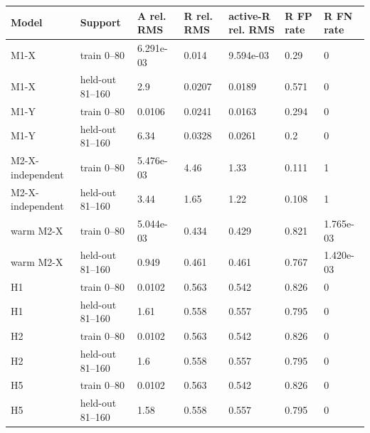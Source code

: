 \begin{tabular}{lllllll}
\toprule
Model & Support & A rel. RMS & R rel. RMS & active-R rel. RMS & R FP rate & R FN rate \\
\midrule
M1-X & train 0--80 & 6.291e-03 & 0.014 & 9.594e-03 & 0.29 & 0 \\
M1-X & held-out 81--160 & 2.9 & 0.0207 & 0.0189 & 0.571 & 0 \\
M1-Y & train 0--80 & 0.0106 & 0.0241 & 0.0163 & 0.294 & 0 \\
M1-Y & held-out 81--160 & 6.34 & 0.0328 & 0.0261 & 0.2 & 0 \\
M2-X-independent & train 0--80 & 5.476e-03 & 4.46 & 1.33 & 0.111 & 1 \\
M2-X-independent & held-out 81--160 & 3.44 & 1.65 & 1.22 & 0.108 & 1 \\
warm M2-X & train 0--80 & 5.044e-03 & 0.434 & 0.429 & 0.821 & 1.765e-03 \\
warm M2-X & held-out 81--160 & 0.949 & 0.461 & 0.461 & 0.767 & 1.420e-03 \\
H1 & train 0--80 & 0.0102 & 0.563 & 0.542 & 0.826 & 0 \\
H1 & held-out 81--160 & 1.61 & 0.558 & 0.557 & 0.795 & 0 \\
H2 & train 0--80 & 0.0102 & 0.563 & 0.542 & 0.826 & 0 \\
H2 & held-out 81--160 & 1.6 & 0.558 & 0.557 & 0.795 & 0 \\
H5 & train 0--80 & 0.0102 & 0.563 & 0.542 & 0.826 & 0 \\
H5 & held-out 81--160 & 1.58 & 0.558 & 0.557 & 0.795 & 0 \\
\bottomrule
\end{tabular}

